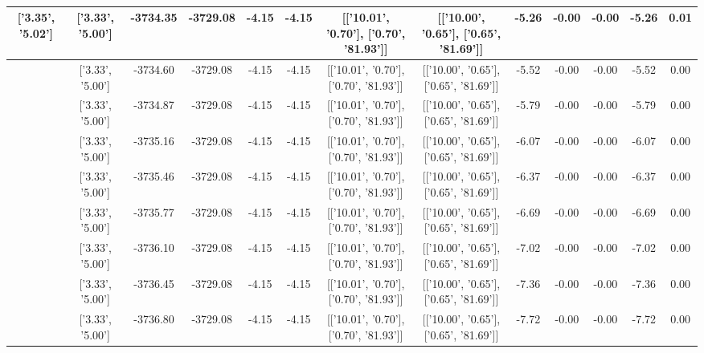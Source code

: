 \begin{table}[htbp]
\begin{adjustbox}{angle=90}
\begin{tabular}{|c|c|c|c|c|c|c|c|c|c|c|c|c|}
 ['3.35', '5.02'] & ['3.33', '5.00'] & -3734.35 & -3729.08 & -4.15 & -4.15 & [['10.01', '0.70'], ['0.70', '81.93']] & [['10.00', '0.65'], ['0.65', '81.69']] & -5.26 & -0.00 & -0.00 & -5.26 & 0.01\\ \hline
 ['3.35', '5.02'] & ['3.33', '5.00'] & -3734.60 & -3729.08 & -4.15 & -4.15 & [['10.01', '0.70'], ['0.70', '81.93']] & [['10.00', '0.65'], ['0.65', '81.69']] & -5.52 & -0.00 & -0.00 & -5.52 & 0.00\\ \hline
 ['3.35', '5.02'] & ['3.33', '5.00'] & -3734.87 & -3729.08 & -4.15 & -4.15 & [['10.01', '0.70'], ['0.70', '81.93']] & [['10.00', '0.65'], ['0.65', '81.69']] & -5.79 & -0.00 & -0.00 & -5.79 & 0.00\\ \hline
 ['3.35', '5.02'] & ['3.33', '5.00'] & -3735.16 & -3729.08 & -4.15 & -4.15 & [['10.01', '0.70'], ['0.70', '81.93']] & [['10.00', '0.65'], ['0.65', '81.69']] & -6.07 & -0.00 & -0.00 & -6.07 & 0.00\\ \hline
 ['3.35', '5.02'] & ['3.33', '5.00'] & -3735.46 & -3729.08 & -4.15 & -4.15 & [['10.01', '0.70'], ['0.70', '81.93']] & [['10.00', '0.65'], ['0.65', '81.69']] & -6.37 & -0.00 & -0.00 & -6.37 & 0.00\\ \hline
 ['3.36', '5.02'] & ['3.33', '5.00'] & -3735.77 & -3729.08 & -4.15 & -4.15 & [['10.01', '0.70'], ['0.70', '81.93']] & [['10.00', '0.65'], ['0.65', '81.69']] & -6.69 & -0.00 & -0.00 & -6.69 & 0.00\\ \hline
 ['3.36', '5.02'] & ['3.33', '5.00'] & -3736.10 & -3729.08 & -4.15 & -4.15 & [['10.01', '0.70'], ['0.70', '81.93']] & [['10.00', '0.65'], ['0.65', '81.69']] & -7.02 & -0.00 & -0.00 & -7.02 & 0.00\\ \hline
 ['3.36', '5.02'] & ['3.33', '5.00'] & -3736.45 & -3729.08 & -4.15 & -4.15 & [['10.01', '0.70'], ['0.70', '81.93']] & [['10.00', '0.65'], ['0.65', '81.69']] & -7.36 & -0.00 & -0.00 & -7.36 & 0.00\\ \hline
 ['3.36', '5.02'] & ['3.33', '5.00'] & -3736.80 & -3729.08 & -4.15 & -4.15 & [['10.01', '0.70'], ['0.70', '81.93']] & [['10.00', '0.65'], ['0.65', '81.69']] & -7.72 & -0.00 & -0.00 & -7.72 & 0.00\\ \hline
            \end{tabular}
        \end{adjustbox}
        \caption{}
        \label{}
    \end{table}
    